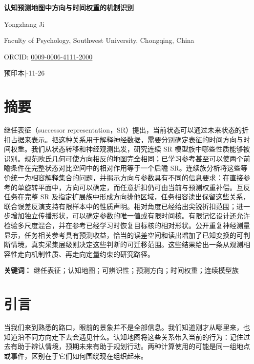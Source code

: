 \documentclass[11pt,a4paper]{article}
\begin{document}
\thispagestyle{plain}
{\raggedright{}\sffamily\bfseries\color{Ink}\fontsize{20}{25}\selectfont 认知预测地图中方向与时间权重的机制识别\par}
\vspace{8pt}
{\sffamily\fontsize{12}{15}\selectfont Yongzhang Ji\par}
\vspace{4pt}
{\sffamily\small Faculty of Psychology, Southwest University, Chongqing,
China\par}
\vspace{3pt}
{\sffamily\footnotesize\color{Muted} ORCID: \href{https://orcid.org/0009-0006-4111-2000}{0009-0006-4111-2000}\par}
\vspace{7pt}
{\sffamily\footnotesize\color{Muted} 预印本\quad |-11-26\par}
\vspace{8pt}
\section{摘要}\label{ux6458ux8981}

继任表征（successor
representation，SR）提出，当前状态可以通过未来状态的折扣占据来表示。把这种关系用于解释神经数据，需要分别确定表征的时间方向与时间权重。我们从状态转移和神经观测出发，研究连续
SR
模型族中哪些性质能够被识别。规范欧氏几何可使方向相反的地图完全相同；已学习参考甚至可以使两个前瞻条件在完整状态对比空间中的相对作用等于一个后瞻
SR。连续族分析将这些等价统一为相容解释集合的问题，并揭示方向与参数具有不同的信息要求：在直接参考的单旋转平面中，方向可以确定，而任意折扣仍可由当前与预测权重补偿。互反任务在完整
SR
及指定扩展族中形成方向排他区域，任务相容读出保留这些关系，联合误差反演支持有限样本中的性质声明。相对角度已经给出尖锐折扣范围；进一步增加独立传播形状，可以确定参数的唯一值或有限时间核。有限记忆设计还允许检验多尺度混合，并在参考已经学习时恢复目标核的相对形状。公开重复神经测量显示，任务相关参考具有预测收益，恰当的误差空间和读出增加了已知变换的可判断情境，真实采集层级则决定这些判断的可迁移范围。这些结果给出一条从观测相容性走向机制性质、再走向定量约束的研究路径。

\textbf{关键词：}
继任表征；认知地图；可辨识性；预测方向；时间权重；连续模型族

\section{引言}\label{ux5f15ux8a00}

当我们来到熟悉的路口，眼前的景象并不是全部信息。我们知道刚才从哪里来，也知道沿不同方向走下去会遇见什么。认知地图将这些关系带入当前的行为：记住过去有助于辨认情境，预期未来有助于规划行动。两种计算使用的可能是同一组地点或事件，区别在于它们如何围绕现在组织起来。
\end{document}
